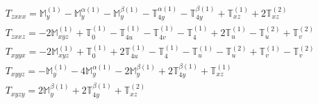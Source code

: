 \documentclass[fleqn,8pt,landscape]{jsarticle}
\begin{document}
\begin{align*}
& T_{zxxx} = \mathbb{M}_{y}^{(1)} - \mathbb{M}_{y}^{\alpha(1)} - \mathbb{M}_{y}^{\beta(1)} - \mathbb{T}_{4y}^{\alpha(1)} - \mathbb{T}_{4y}^{\beta(1)} + \mathbb{T}_{xz}^{(1)} + 2 \mathbb{T}_{xz}^{(2)} \\
& T_{zxxz} = - 2 \mathbb{M}_{xyz}^{(1)} + \mathbb{T}_{0}^{(1)} - \mathbb{T}_{4u}^{(1)} - \mathbb{T}_{4v}^{(1)} - \mathbb{T}_{4}^{(1)} + 2 \mathbb{T}_{u}^{(1)} - \mathbb{T}_{u}^{(2)} + \mathbb{T}_{v}^{(2)} \\
& T_{xyyx} = - 2 \mathbb{M}_{xyz}^{(1)} + \mathbb{T}_{0}^{(1)} + 2 \mathbb{T}_{4u}^{(1)} - \mathbb{T}_{4}^{(1)} - \mathbb{T}_{u}^{(1)} - \mathbb{T}_{u}^{(2)} + \mathbb{T}_{v}^{(1)} - \mathbb{T}_{v}^{(2)} \\
& T_{xyyz} = - \mathbb{M}_{y}^{(1)} - 4 \mathbb{M}_{y}^{\alpha(1)} - 2 \mathbb{M}_{y}^{\beta(1)} + 2 \mathbb{T}_{4y}^{\beta(1)} + \mathbb{T}_{xz}^{(1)} \\
& T_{xyzy} = 2 \mathbb{M}_{y}^{\beta(1)} + 2 \mathbb{T}_{4y}^{\beta(1)} + \mathbb{T}_{xz}^{(2)}
\end{align*}
\end{document}
